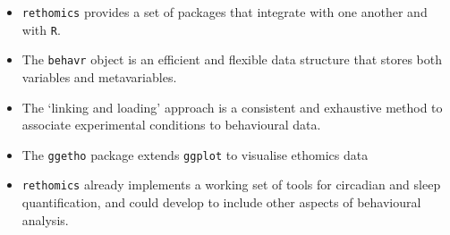 \begin{itemize}
	\item \texttt{rethomics} provides a set of packages that integrate with one another and with  \texttt{R}.
	\item  The \texttt{behavr} object is an efficient and flexible data structure that stores both variables and metavariables.
	\item The `linking and loading' approach is a consistent and exhaustive method to associate experimental conditions to behavioural data.
	\item The \texttt{ggetho} package extends \texttt{ggplot} to visualise ethomics data
	\item \texttt{rethomics} already implements a working set of tools for circadian and sleep quantification, and could develop to include other aspects of behavioural analysis.
\end{itemize}


